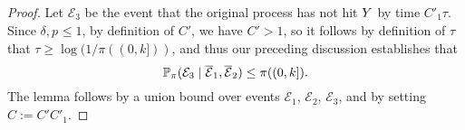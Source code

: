 \begin{proof}
\begin{comment}
 }
Thus, the total time the process $\mathfrak{D}$ takes during $\tau$ steps is bounded from above by the sum of $\tau$ positive i.i.d.~random variables $Z_1, \ldots, Z_{\tau}$, all satisfying~\eqref{obs:markov2}.
We now apply Lemma~\ref{bentkus} to $Z:=Z_1+\ldots+Z_{\tau}$: first, for each $1 \le i \le \tau$, we have $\EE(Z_i) \le L_{}$, and $Z_i \preccurlyeq Y^{[L_{}]}$, where $Y^{[L_{}]}$ is a random variable with $\EE(Y^{[L_{}]})=L_{}$, defined so that $\P(Y^{[L_{}]} \ge x)=\P(Z_i \ge x)$ for all $x \ge b$ for some value of $b > 0$ depending on $L_{}$ only: this can be achieved by setting $\P(Y^{[L_{}]}=0):=\P(Z_i=0)=0$ (the equality follows since $Z_i$ describes the worst-case behavior of the original process which is continuous), and by setting $b$ in such a way that $\P(Y^{[L_{}]}=b)=1-\int_{x \ge b} d\PP_{Z_i}(x)$ satisfies $b (1-\int_{x \ge b} d\PP_{Z_i}(x)) + \int_{x \ge b}  x d\PP_{Z_i}(x)=L_{}$ (clearly the left hand side is increasing in $b$; if $\EE(Z_i)=L_{}$, then $b=0$ is the only solution to this, otherwise there exists exactly one solution $b \le L_{}$ by continuity of $Z_i$.) Setting $T:=\sum_{i=1}^{\tau} Y^{[L_{}]}_i$, where the $Y^{[L_{}]}_i$ are i.i.d~copies of $Y^{[L_{}]}$, by Lemma~\ref{bentkus},  we get
$$
\P(Z \ge 12 \rho L_{}\tau) \le \inf_{h \le 12 \rho L_{}\tau} e^{-12h\rho L_{}\tau}\EE(e^{hT}).
$$
By independence of the $Y^{[L_{}]}_i$'s we have 
$$
\EE(e^{hT})=\big(\EE(e^{hY^{[L_{}]}})\big)^{\tau} = \Big(\int_{0}^{\infty} e^{hx}d\PP(Y^{[L_{}]})(x)\Big)^{\tau}.
$$
Letting $h:=1/(4\rho L)$
and assuming $12\rho L\tau$ is an integer,
by~\eqref{obs:markov2} we get that the integral inside the parenthesis above is at most  
\[
 \sum_{i\geq 0}e^{h(i+1)\rho L_{}}\P(i\rho L_{}\le Z \le (i+1) \rho L_{})
 \leq 
 \sum_{i \ge 0} e^{h(i+1)\rho L_{}} e^{-i}
 \leq e^{1/4}+ \sum_{i \ge 1} e^{-i/2}
 \leq 4.
\]
Hence, from the three preceding displayed inequalities it follows that
\begin{align*}
\P(Z \ge 12 \rho L_{}\tau) &
\le e^{-12 h\rho L_{}\tau} 4^{\tau} 
= \big(4/e^{3}\big)^{\tau}
\leq e^{-\tau}.
\end{align*}

\dmc{until here you could then delete I think it is ok}
\end{comment}

Let $\mathcal{E}_3$ be the event that the original process has not hit $\auxY$ by time 
$C'_1\tau$. Since $\delta,p_{}\leq 1$, by definition of $C'$, we have $C'>1$, so it follows by definition of $\tau$ that $\tau\geq \log(1/\pi((0,k]))$, and thus our preceding discussion establishes that 
\[
\P_{\pi}(\mathcal{E}_3 \mid \overline{\mathcal{E}}_1, \overline{\mathcal{E}}_2 ) \le \pi((0,k]).
\]
The lemma follows by a union bound over events $\mathcal{E}_1$, $\mathcal{E}_2$, $\mathcal{E}_3$, and by setting $\widehat{C}:=C'C'_1$.
\end{proof}

